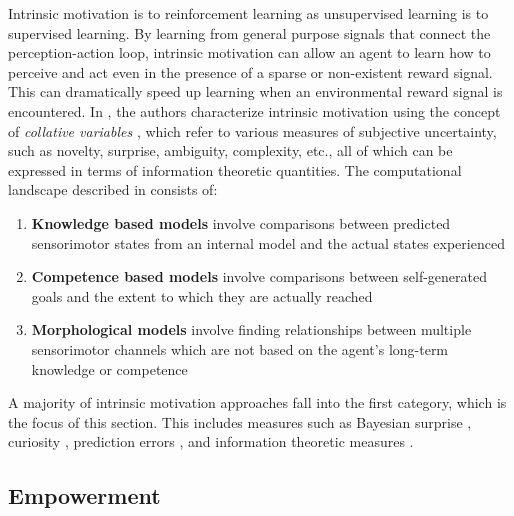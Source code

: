 Intrinsic motivation is to reinforcement learning as unsupervised learning is to supervised learning. By learning from general purpose signals that connect the perception-action loop, intrinsic motivation can allow an agent to learn how to perceive and act even in the presence of a sparse or non-existent reward signal. This can dramatically speed up learning when an environmental reward signal is encountered. In \cite{oudeyer2008can}, the authors characterize intrinsic motivation using the concept of \textit{collative variables} \cite{berlyne1965structure}, which refer to various measures of subjective uncertainty, such as novelty, surprise, ambiguity, complexity, etc., all of which can be expressed in terms of information theoretic quantities. The computational landscape described in \cite{oudeyer2008can} consists of:
\begin{enumerate}
	\item \textbf{Knowledge based models} involve comparisons between predicted sensorimotor states from an internal model and the actual states experienced
	\item \textbf{Competence based models} involve comparisons between self-generated goals and the extent to which they are actually reached
	\item \textbf{Morphological models} involve finding relationships between multiple sensorimotor channels which are not based on the agent's long-term knowledge or competence
\end{enumerate}
A majority of intrinsic motivation approaches fall into the first category, which is the focus of this section. This includes measures such as Bayesian surprise \cite{itti2006bayesian}, curiosity \cite{schmidhuber2010formal}, prediction errors \cite{nelson2005finding, barto2004intrinsically}, and information theoretic measures \cite{klyubin2005empowerment, little2013learning, wissner2013causal}. 

\subsection{Empowerment}

